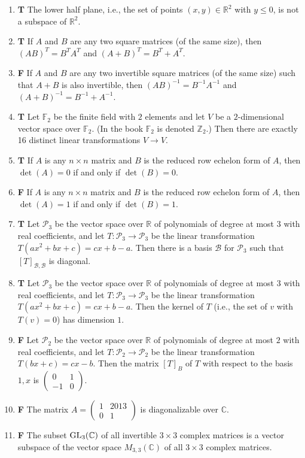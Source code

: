 \documentclass[12pt]{article}
\newcommand{\tf}[2]{\item {\bf {\color{blue}\hspace{1em}#1}}\hspace{1em} #2}
\newcommand{\R}{\mathbb{R}}
\newcommand{\C}{\mathbb{C}}
\newcommand{\F}{\mathbb{F}}
\renewcommand{\P}{\mathcal{P}}
\begin{document}
\begin{enumerate}
\tf{T}{The lower half plane, i.e., the set of points $(x,y) \in \R^2$ with $y\leq 0$, is not a subspace of $\R^2$.}

\tf{T}{If $A$ and $B$ are any two square matrices (of the same size), then $(AB)^T=B^T A^T$ and $(A+B)^T= B^T + A^T$.}

\tf{F}{If $A$ and $B$ are any two invertible square matrices (of the same size) such that $A+B$ is also invertible,
then $(AB)^{-1}=B^{-1} A^{-1}$ and $(A+B)^{-1}= B^{-1} + A^{-1}$.}

\tf{T}{Let $\F_2$ be the finite field with $2$ elements and let $V$ be a $2$-dimensional
    vector space over $\F_2$. (In the book $\F_2$ is denoted $\mathbb{Z}_2$.)   Then there are exactly 16 distinct linear transformations $V\to V$.}


\tf{T}{If $A$ is any $n\times n$ matrix and $B$ is the reduced row echelon form of $A$, then $\det(A)=0$ if and only if $\det(B)=0$.}

\tf{F}{If $A$ is any $n\times n$ matrix and $B$ is the reduced row echelon form of $A$, then $\det(A)=1$ if and only if $\det(B)=1$.}

\tf{T}{Let $\P_3$ be the vector space over $\R$ of polynomials of degree at most $3$ with real coefficients,
and let $T:\P_3\to\P_3$ be the linear transformation $T(ax^2+bx+c)=cx + b-a$.  Then there is a basis $\mathcal{B}$ for $\P_3$ such that $[T]_{\mathcal{B},\mathcal{B}}$ is diagonal.}

\tf{T}{Let $\P_3$ be the vector space over $\R$ of polynomials of degree at most $3$ with real coefficients,
and let $T:\P_3\to\P_3$ be the linear transformation $T(ax^2+bx+c)=cx+b-a$.
Then the kernel of $T$ (i.e., the set of $v$ with $T(v)=0$) has dimension $1$.}

\tf{F}{Let $\P_2$ be the vector space over $\R$ of polynomials of degree at most $2$ with real coefficients,
and let $T:\P_2\to\P_2$ be the linear transformation $T(bx+c)=cx-b$.  Then the matrix $[T]_B$ of $T$
with respect to the basis $1,x$ is $\left(\begin{array}{rr}
0 & 1 \\
-1 & 0
\end{array}\right)$.
}


\tf{F}{The matrix $A=\left(\begin{array}{rr}
1 & 2013 \\
0 & 1
\end{array}\right)$ is diagonalizable over $\C$.}

\tf{F}{The subset ${\rm GL}_3(\C)$ of all invertible $3\times 3$ complex matrices is a vector subspace of
the vector space $M_{3,3}(\C)$ of all $3\times 3$ complex matrices.}


\end{enumerate}
\end{document}
